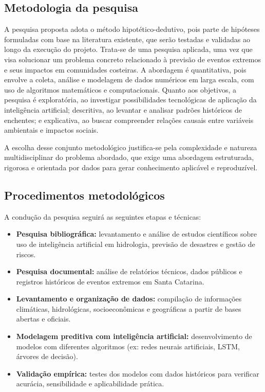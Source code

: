 
\subsection{Metodologia da pesquisa}
\label{sec:metodologia-pesquisa}

A pesquisa proposta adota o método hipotético-dedutivo, pois parte de hipóteses formuladas com base na literatura existente, que serão testadas e validadas ao longo da execução do projeto. Trata-se de uma pesquisa aplicada, uma vez que visa solucionar um problema concreto relacionado à previsão de eventos extremos e seus impactos em comunidades costeiras. A abordagem é quantitativa, pois envolve a coleta, análise e modelagem de dados numéricos em larga escala, com uso de algoritmos matemáticos e computacionais. Quanto aos objetivos, a pesquisa é exploratória, ao investigar possibilidades tecnológicas de aplicação da inteligência artificial; descritiva, ao levantar e analisar padrões históricos de enchentes; e explicativa, ao buscar compreender relações causais entre variáveis ambientais e impactos sociais.

A escolha desse conjunto metodológico justifica-se pela complexidade e natureza multidisciplinar do problema abordado, que exige uma abordagem estruturada, rigorosa e orientada por dados para gerar conhecimento aplicável e reproduzível.

\subsection{Procedimentos metodológicos}
\label{sec:procedimentos}

A condução da pesquisa seguirá as seguintes etapas e técnicas:

\begin{itemize}
  \item \textbf{Pesquisa bibliográfica:} levantamento e análise de estudos científicos sobre uso de inteligência artificial em hidrologia, previsão de desastres e gestão de riscos.
  \item \textbf{Pesquisa documental:} análise de relatórios técnicos, dados públicos e registros históricos de eventos extremos em Santa Catarina.
  \item \textbf{Levantamento e organização de dados:} compilação de informações climáticas, hidrológicas, socioeconômicas e geográficas a partir de bases abertas e oficiais.
  \item \textbf{Modelagem preditiva com inteligência artificial:} desenvolvimento de modelos com diferentes algoritmos (ex: redes neurais artificiais, LSTM, árvores de decisão).
  \item \textbf{Validação empírica:} testes dos modelos com dados históricos para verificar acurácia, sensibilidade e aplicabilidade prática.
\end{itemize}


